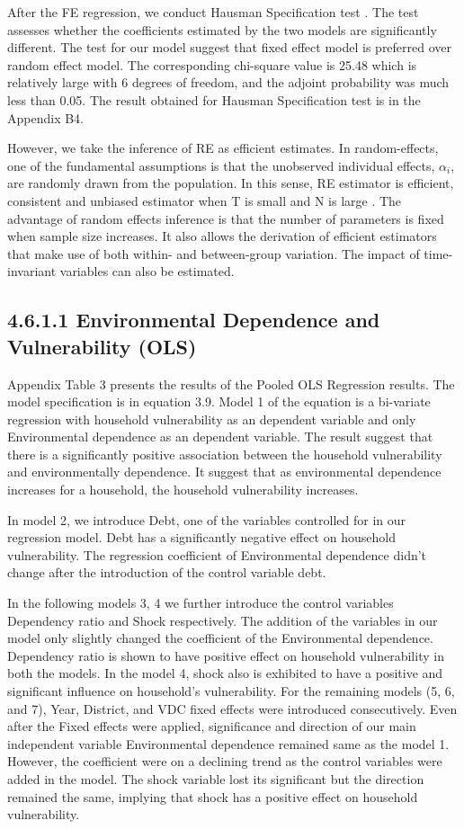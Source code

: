\documentclass[12pt, a4paper]{article}
\begin{document}
After the FE regression, we conduct Hausman Specification test \citep{hausman1978specification}. The test assesses whether the coefficients estimated by the two models are significantly different. The test for our model suggest that fixed effect model is preferred over random effect model. The corresponding chi-square value is 25.48 which is relatively large with 6 degrees of freedom, and the adjoint probability was much less than 0.05. The result obtained for Hausman Specification test is in the Appendix B4.

However, we take the inference of RE as efficient estimates. In random-effects, one of the fundamental assumptions is that the unobserved individual effects, $\mathit{\alpha_i}$, are randomly drawn from the population. In this sense, RE estimator is efficient, consistent and unbiased estimator when T is small and N is large \citep{hsiao2022analysis}. The advantage of random effects inference is that the number of
parameters is fixed when sample size increases. It also allows the derivation of efficient
estimators that make use of both within- and between-group variation. The impact of
time-invariant variables can also be estimated.
\subsection*{4.6.1.1 Environmental Dependence and Vulnerability (OLS)}
Appendix Table 3 presents the results of the Pooled OLS Regression results. The model specification is in equation 3.9. Model 1 of the equation is a bi-variate regression with household vulnerability as an dependent variable and only Environmental dependence as an dependent variable. The result suggest that there is a significantly positive association between the household vulnerability and environmentally dependence. It suggest that as environmental dependence increases for a household, the household vulnerability increases. 

In model 2, we introduce Debt, one of the variables controlled for in our regression model. Debt has a significantly negative effect on household vulnerability. The regression coefficient of Environmental dependence didn't change after the introduction of the control variable debt. 

In the following models 3, 4 we further introduce the control variables Dependency ratio and Shock respectively. The addition of the variables in our model only slightly changed the coefficient of the Environmental dependence. Dependency ratio is shown to have positive effect on household vulnerability in both the models. In the model 4, shock also is exhibited to have a positive and significant influence on household's vulnerability. For the remaining models (5, 6, and 7), Year, District, and VDC fixed effects were introduced consecutively. Even after the Fixed effects were applied, significance and direction of our main independent variable Environmental dependence remained same as the model 1. However, the coefficient were on a declining trend as the control variables were added in the model. The shock variable lost its significant but the direction remained the same, implying that shock has a positive effect on household vulnerability.
\end{document}
